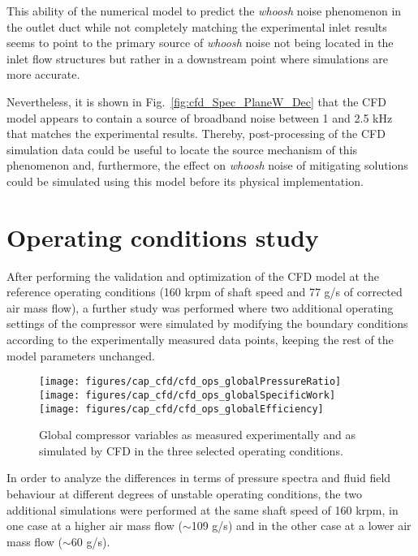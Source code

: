 This ability of the numerical model to predict the \emph{whoosh} noise phenomenon in the outlet duct while not completely matching the experimental inlet results seems to point to the primary source of \emph{whoosh} noise not being located in the inlet flow structures but rather in a downstream point where simulations are more accurate.

Nevertheless, it is shown in Fig.~\ref{fig:cfd_Spec_PlaneW_Dec} that the CFD model appears to contain a source of broadband noise between 1 and 2.5 kHz that matches the experimental results. Thereby, post-processing of the CFD simulation data could be useful to locate the source mechanism of this phenomenon and, furthermore, the effect on \emph{whoosh} noise of mitigating solutions could be simulated using this model before its physical implementation. 

\section{Operating conditions study} %

After performing the validation and optimization of the CFD model at the reference operating conditions (160 krpm of shaft speed and 77 g/s of corrected air mass flow), a further study was performed where two additional operating settings of the compressor were simulated by modifying the boundary conditions according to the experimentally measured data points, keeping the rest of the model parameters unchanged.

\begin{wrapfigure}[27]{l}[0.8cm]{0.45\textwidth}
\vspace{-4mm}
\centering
\texttt{[image: figures/cap\_cfd/cfd\_ops\_globalPressureRatio]}\\[4mm]
\texttt{[image: figures/cap\_cfd/cfd\_ops\_globalSpecificWork]}\\[4mm]
\texttt{[image: figures/cap\_cfd/cfd\_ops\_globalEfficiency]}\\[2mm]
\caption{Global compressor variables as measured experimentally and as simulated by CFD in the three selected operating conditions.}
\label{fig:cfd_ops_globals}
\end{wrapfigure}

In order to analyze the differences in terms of pressure spectra and fluid field behaviour at different degrees of unstable operating conditions, the two additional simulations were performed at the same shaft speed of 160 krpm, in one case at a higher air mass flow  ($\sim$109 g/s) and in the other case at a lower air mass flow ($\sim$60 g/s).

